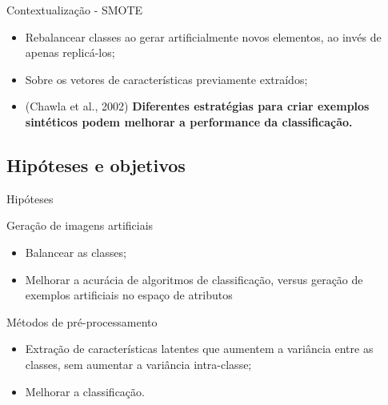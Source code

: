 \documentclass{beamer}
\begin{document}
\begin{frame}{Contextualização - SMOTE}
\justifying
    \begin{itemize}
        \item Rebalancear classes ao gerar artificialmente novos elementos, ao invés de apenas replicá-los;
        \item Sobre os vetores de características previamente extraídos;
        \item (Chawla et al., 2002) \textbf{Diferentes estratégias para criar exemplos sintéticos podem melhorar a performance da classificação.}
    \end{itemize}
\end{frame}
\subsection{Hipóteses e objetivos}
\begin{frame}{Hipóteses}
  \begin{block}{Geração de imagens artificiais}
    \justifying
    \begin{itemize}
      \item Balancear as classes;
      \item Melhorar a acurácia de algoritmos de classificação, versus geração de exemplos artificiais no espaço de atributos
    \end{itemize}
  \end{block}
  \begin{block}{Métodos de pré-processamento}
    \justifying
    \begin{itemize}
      \item Extração de características latentes que aumentem a variância entre as classes, sem aumentar a variância intra-classe;
      \item Melhorar a classificação.
    \end{itemize}
  \end{block}
\end{frame}
\end{document}
